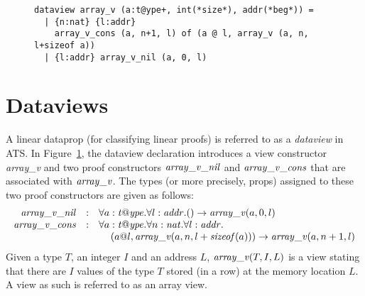 \begin{figure}
\begin{verbatim}
dataview array_v (a:t@ype+, int(*size*), addr(*beg*)) =
  | {n:nat} {l:addr}
    array_v_cons (a, n+1, l) of (a @ l, array_v (a, n, l+sizeof a))
  | {l:addr} array_v_nil (a, 0, l)
\end{verbatim}
\caption{}
\label{figure:array_v}
\end{figure}
\section{Dataviews}
A linear dataprop (for classifying linear proofs) is referred to as a {\it
dataview} in ATS. In Figure~\ref{figure:array_v}, the dataview declaration
introduces a view constructor {\it array\_v} and two proof constructors
${\it array\_v\_nil}$ and ${\it array\_v\_cons}$ that are associated with
${\it array\_v}$. The types (or more precisely, props) assigned to these
two proof constructors are given as follows:
\[\begin{array}{rcl}
{\it array\_v\_nil} & : &
\forall a:{\it t@ype}.\forall l:{\it addr}. () \rightarrow {\it array\_v} (a, 0, l) \\
{\it array\_v\_cons} & : &
\forall a:{\it t@ype}.\forall n:{\it nat}.\forall l:{\it addr}. \\
&&\kern12pt
(a @ l, {\it array\_v} (a, n, l+{\it sizeof}(a))) \rightarrow {\it array\_v} (a, n+1, l) \\
\end{array}\]
Given a type $T$, an integer $I$ and an address $L$, ${\it array\_v}(T, I,
L)$ is a view stating that there are $I$ values of the type $T$ stored (in
a row) at the memory location $L$. A view as such is referred to as an
array view.

